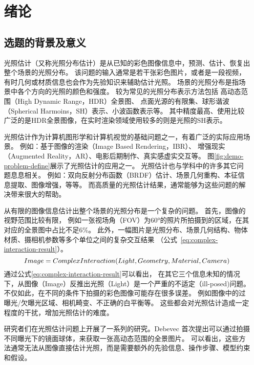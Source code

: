 \chapter{绪论}\label{chap:introduction}

\section{选题的背景及意义}

光照估计（又称光照分布估计）是从已知的彩色图像信息中，预测、估计、恢复出整个场景的光照分布。
该问题的输入通常是若干张彩色图片，或者是一段视频，有时几何或材质信息也会作为先验知识来辅助估计光照。
场景的光照分布是指场景中各个方向的光照的颜色和强度。
较为常见的光照分布表示方法包括
高动态范围（High Dynamic Range，HDR）全景图、
点面光源的有限集、球形谐波（Spherical Harmoins，SH）表示、小波函数表示等。
其中精度最高、使用比较广泛的是HDR全景图像，在实时渲染领域使用较多的则是光照的SH表示。 

光照估计作为计算机图形学和计算机视觉的基础问题之一，有着广泛的实际应用场景。
例如：基于图像的渲染（Image Based Rendering，IBR）、
增强现实（Augmented Reality，AR）、电影后期制作、真实感虚实交互等。
图\ref{fig:demo-problem-define}展示了光照估计的应用之一。
光照估计也与学科中的许多其它问题息息相关。
例如：双向反射分布函数（BRDF）估计、场景几何重构、本征信息提取、图像增强，等等。
而高质量的光照估计结果，通常能够为这些问题的解决带来很大的帮助。

 

从有限的图像信息估计出整个场景的光照分布是一个复杂的问题。
首先，图像的视野范围比较有限，
例如一张视场角（FOV）为60°的照片所拍摄到的区域，在其对应的全景图中占比不足6\%。
此外，一幅图片是光照分布、场景几何结构、物体材质、摄相机参数等多个单位之间的复杂交互结果
（公式~\ref{eq:complex-interaction-result}）。
\begin{equation} \centering \label{eq:complex-interaction-result}
Image = ComplexInteraction(Light, Geometry, Material, Camera)\end{equation}
通过公式\ref{eq:complex-interaction-result}可以看出，
在其它三个信息未知的情况下，从图像（Image）反推出光照（Light）是一个严重的不适定（ill-posed)问题。
不仅如此，在不同的条件下拍摄的彩色图像可能存在很多误差。
例如图像中的过曝光/欠曝光区域、相机畸变、不正确的白平衡等。
这些都会对光照估计造成一定程度的干扰，增加光照估计的难度。

研究者们在光照估计问题上开展了一系列的研究。Debevec\cite{debevec1998rendering}
首次提出可以通过拍摄不同曝光下的镜面球体，来获取一张高动态范围的全景图片。
可以看出，这些方法通常无法从图像直接估计光照，而是需要额外的先验信息、操作步骤、模型约束和假设。

